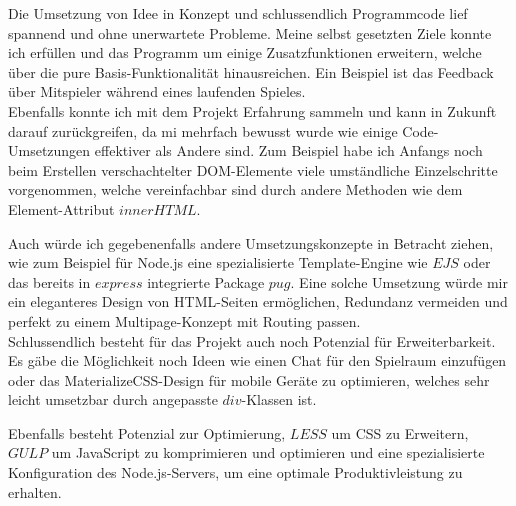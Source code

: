 \documentclass[12pt]{scrartcl}
\begin{document}
	Die Umsetzung von Idee in Konzept und schlussendlich Programmcode lief spannend und ohne unerwartete Probleme. Meine selbst gesetzten Ziele konnte ich erfüllen und das Programm um einige Zusatzfunktionen erweitern, welche über die pure Basis-Funktionalität hinausreichen. Ein Beispiel ist das Feedback über Mitspieler während eines laufenden Spieles.\\
	
	Ebenfalls konnte ich mit dem Projekt Erfahrung sammeln und kann in Zukunft darauf zurückgreifen, da mi mehrfach bewusst wurde wie einige Code-Umsetzungen effektiver als Andere sind. Zum Beispiel habe ich Anfangs noch beim Erstellen verschachtelter DOM-Elemente viele umständliche Einzelschritte vorgenommen, welche vereinfachbar sind durch andere Methoden wie dem Element-Attribut $innerHTML$.
	
	Auch würde ich gegebenenfalls andere Umsetzungskonzepte in Betracht ziehen, wie zum Beispiel für Node.js eine spezialisierte Template-Engine wie $EJS$ oder das bereits in $express$ integrierte Package $pug$. Eine solche Umsetzung würde mir ein eleganteres Design von HTML-Seiten ermöglichen, Redundanz vermeiden und perfekt zu einem Multipage-Konzept mit Routing passen.\\
	
	Schlussendlich besteht für das Projekt auch noch Potenzial für Erweiterbarkeit. Es gäbe die Möglichkeit noch Ideen wie einen Chat für den Spielraum einzufügen oder das MaterializeCSS-Design für mobile Geräte zu optimieren, welches sehr leicht umsetzbar durch angepasste $div$-Klassen ist.
	
	Ebenfalls besteht Potenzial zur Optimierung, $LESS$ um CSS zu Erweitern, $GULP$ um JavaScript zu komprimieren und optimieren und eine spezialisierte Konfiguration des Node.js-Servers, um eine optimale Produktivleistung zu erhalten.
\end{document}
